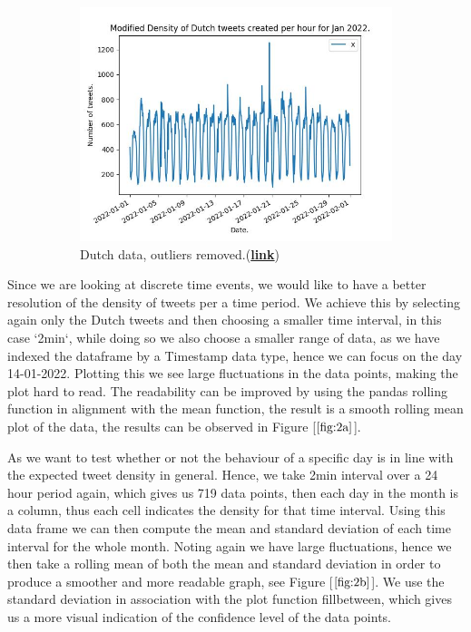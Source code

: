 \documentclass[10pt]{article}
\begin{document}
\begin{figure}[h!]
\begin{subfigure}[b]{0.3\textwidth}
        \label{fig:1b}
    \end{subfigure}
    \begin{subfigure}[b]{0.3\textwidth}
        \includegraphics[scale=0.34]{figures/JanNLmod.jpeg}
        \caption{Dutch data, outliers
        removed.(\href{https://github.com/JamesZor/data-WranglingProject/blob/main/figures/JanNLmod.jpeg}{\color{blue}\textbf{link}})}
        \label{fig:1c}
    \end{subfigure}
    \caption{}
    \label{fig:g1}
\end{figure}

Since we are looking at discrete time events, we would like to have a better resolution of
the density of tweets per a time period. We achieve this by selecting again only the
Dutch tweets and then choosing a smaller time interval, in this case `2min`, while doing so
we also choose a smaller range of data, as we have indexed the dataframe by a Timestamp data
type, hence we can focus on the day 14-01-2022. Plotting this we see large fluctuations in the
data points, making the plot hard to read. The readability can be improved by using the
pandas rolling function in alignment with the mean function, the result is a smooth rolling
mean plot of the data, the results can be observed in Figure [$\ref{fig:2a}$].

As we want to test whether or not the behaviour of a specific day is in line with the
expected tweet density in general. Hence, we take 2min interval over a 24 hour period
again, which gives us 719 data points, then each day in the month is a column, thus each
cell indicates the density for that time interval. Using this data frame we can then
compute the mean and standard deviation of each time interval for the whole month. Noting
again we have large fluctuations, hence we then take a rolling mean of both the mean and
standard deviation in order to produce a smoother and more readable graph, see Figure
[$\ref{fig:2b}$]. We use the standard deviation in association with the plot function
fillbetween, which gives us a more visual indication of the confidence level of the data
points.
\end{document}
